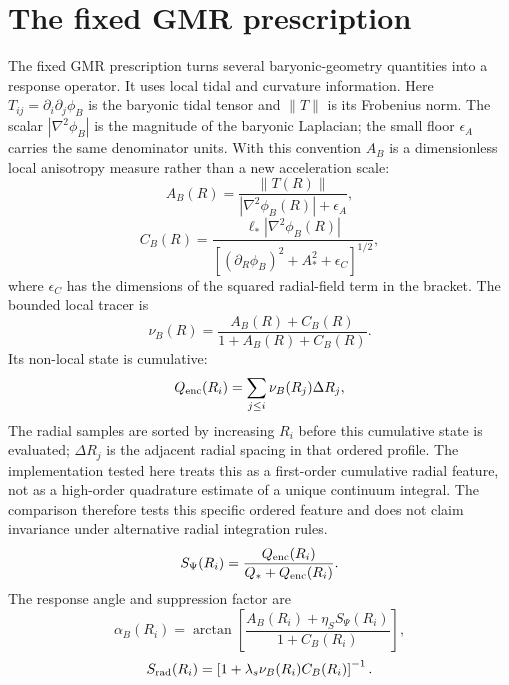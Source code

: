 ﻿\documentclass[twocolumn]{aastex631}
\begin{document}
\section{The fixed GMR prescription}
The fixed GMR prescription turns several baryonic-geometry quantities into a response operator.  It uses local tidal and curvature information.  Here $T_{ij}=\partial_i\partial_j\phi_B$ is the baryonic tidal tensor and $\|T\|$ is its Frobenius norm.  The scalar $|\nabla^2\phi_B|$ is the magnitude of the baryonic Laplacian; the small floor $\epsilon_A$ carries the same denominator units.  With this convention $A_B$ is a dimensionless local anisotropy measure rather than a new acceleration scale:
\begin{equation}
A_B(R)=\frac{\|T(R)\|}{|\nabla^2\phi_B(R)|+\epsilon_A},
\end{equation}
\begin{equation}
C_B(R)=
\frac{\ell_*|\nabla^2\phi_B(R)|}
{\left[(\partial_R\phi_B)^2+A_*^2+\epsilon_C\right]^{1/2}},
\end{equation}
where $\epsilon_C$ has the dimensions of the squared radial-field term in the bracket.  The bounded local tracer is
\begin{equation}
\nu_B(R)=\frac{A_B(R)+C_B(R)}{1+A_B(R)+C_B(R)} .
\end{equation}
Its non-local state is cumulative:
\begin{equation}
Q_{\rm enc}(R_i)=\sum_{j\le i}\nu_B(R_j)\Delta R_j,
\end{equation}
The radial samples are sorted by increasing $R_i$ before this cumulative state is evaluated; $\Delta R_j$ is the adjacent radial spacing in that ordered profile.  The implementation tested here treats this as a first-order cumulative radial feature, not as a high-order quadrature estimate of a unique continuum integral.  The comparison therefore tests this specific ordered feature and does not claim invariance under alternative radial integration rules.
\begin{equation}
S_\Psi(R_i)=
\frac{Q_{\rm enc}(R_i)}{Q_*+Q_{\rm enc}(R_i)} .
\end{equation}
The response angle and suppression factor are
\begin{equation}
\alpha_B(R_i)=\arctan
\left[
\frac{A_B(R_i)+\eta_S S_\Psi(R_i)}{1+C_B(R_i)}
\right],
\end{equation}
\begin{equation}
S_{\rm rad}(R_i)=
\left[1+\lambda_s\nu_B(R_i)C_B(R_i)\right]^{-1} .
\end{equation}
\end{document}
